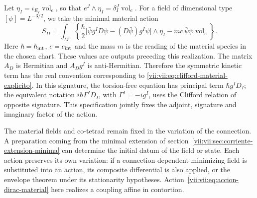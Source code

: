 Let \(\eta_I=\iota_{E_I}\operatorname{vol}_e\), so that
\(e^J\wedge\eta_I=\delta_I^J\operatorname{vol}_e\). For a
field of dimensional type \([\psi]=L^{-3/2}\), we take the minimal
material action
\begin{equation}
 S_D=\int_M\left\{
 \frac{\hbar}{2}
 \bigl[\bar\psi g^I D\psi-(D\bar\psi)g^I\psi\bigr]\wedge\eta_I
 -mc\,\bar\psi\psi\operatorname{vol}_e\right\}.
 \label{vii:vii:eq:accion-dirac-material}
\end{equation}
Here \(\hbar=\hbar_{\rm int}\), \(c=c_{\rm int}\) and the mass
\(m\) is the reading of the material species in the chosen chart.
These values are outputs preceding this realization. The matrix
\(A_D\) is Hermitian and \(A_Dg^I\) is anti-Hermitian. Therefore the
symmetric kinetic term has the real convention corresponding to
\eqref{vii:vii:eq:clifford-material-explicito}. In this signature, the torsion-free
equation has principal term \(\hbar g^I D_I\); the equivalent
notation \(i\hbar\Gamma^I D_I\), with \(\Gamma^I=-i g^I\),
uses the Clifford relation of opposite signature. This specification jointly
fixes the adjoint, signature and imaginary factor of the action.

The material fields and co-tetrad remain fixed in the variation
of the connection. A preparation coming from the minimal extension of
section~\ref{vii:vii:sec:corriente-extension-minima} can determine
the initial datum of the field or state. Each action preserves its
own variation: if a connection-dependent minimizing field
is substituted into an action, its composite differential is also applied,
or the envelope theorem under its stationarity hypotheses.
Action~\eqref{vii:vii:eq:accion-dirac-material} here realizes a
coupling affine in contortion.

